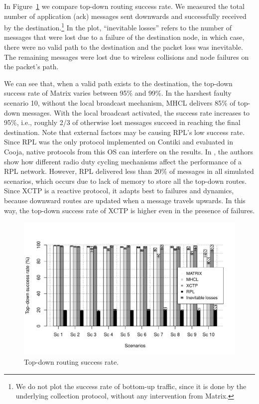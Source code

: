 In Figure~\ref{fig:txdwn} we compare top-down routing success rate. We measured the total
number of application (ack) messages sent downwards and successfully received by
the destination.\footnote{We do not plot the success rate of bottom-up traffic,
since it is done by the underlying collection protocol, without any
intervention from Matrix.} In the plot, ``inevitable losses'' refers to the
number of messages that were lost due to a failure of the destination node, in which case, there were no valid path to the destination and the packet loss was inevitable.
The remaining messages were lost due to wireless collisions and node failures on
the packet's path. 

We can see that, when a valid path exists to the destination, the top-down success rate of Matrix varies between 95\% and 99\%. In the harshest faulty scenario 10, without the local broadcast mechanism, MHCL delivers 85\% of top-down messages. With the local broadcast activated, the success rate increases to 95\%, i.e., roughly 2/3 of otherwise lost messages succeed in reaching the final destination.
Note that external factors may be causing RPL's low success rate. Since RPL was the only protocol implemented on Contiki and evaluated in Cooja, native protocols from this OS can interfere on the results. In \cite{Bezunartea:2016}, the authors show how different radio duty cycling mechanisms affect the performance of a RPL network. However, RPL delivered less than $20\%$ of messages in all simulated scenarios, which occurs due to lack of memory to store all the top-down routes.  Since XCTP is a reactive protocol, it adapts best to failures and dynamics, because downward routes are updated when a message travels upwards. In this way, the top-down success rate of XCTP is higher even in the presence of failures.

\begin{figure}[h]
    \centering
    \includegraphics[width=1\linewidth]{Images/txrouting.pdf}
    \caption{Top-down routing success rate.}
    \label{fig:txdwn}
\end{figure}

